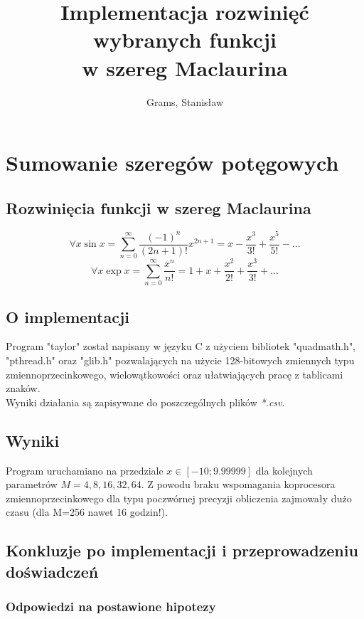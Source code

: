 \documentclass[12pt]{article}
\begin{document}
\title{Implementacja rozwinięć wybranych funkcji\\w szereg Maclaurina}
\author{Grams, Stanisław}

\maketitle

\section{Sumowanie szeregów potęgowych}

\subsection{Rozwinięcia funkcji w szereg Maclaurina}
$$ \forall{x} \sin x = \sum_{n=0}^{\infty} \frac{(-1)^n}{(2n+1)!} x^{2n+1} = x - \frac{x^3}{3!} + \frac{x^5}{5!} - ...$$
$$ \forall {x} \exp{x} = \sum_{n=0}^{\infty} \frac{x^n}{n!} = 1 + x + \frac{x^2}{2!} + \frac{x^3}{3!} + ...$$

\subsection{O implementacji}
Program "taylor" został napisany w języku C z użyciem bibliotek "quadmath.h", "pthread.h" oraz "glib.h" pozwalających na użycie 128-bitowych zmiennych typu zmiennoprzecinkowego, wielowątkowości oraz ułatwiających pracę z tablicami znaków.\\
Wyniki działania są zapisywane do poszczególnych plików \textit{*.csv}.

\subsection{Wyniki}
Program uruchamiano na przedziale $x \in [-10; 9.99999]$ dla kolejnych parametrów $M = 4, 8, 16, 32, 64$. Z powodu braku wspomagania koprocesora zmiennoprzecinkowego dla typu poczwórnej precyzji obliczenia zajmowały dużo czasu (dla M=256 nawet 16 godzin!).

\subsection{Konkluzje po implementacji i przeprowadzeniu doświadczeń}
\subsubsection{Odpowiedzi na postawione hipotezy}
\end{document}
